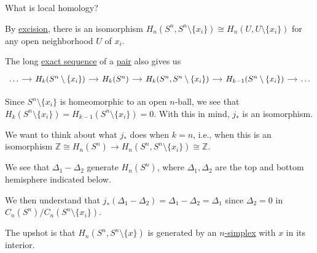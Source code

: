 \begin{problem}
What is local homology?
\end{problem}
\begin{answer}
	By \hyperref[thm:excision]{excision}, there is an isomorphism \(H_n(S^n, S^n \setminus \{x_i\}) \cong H_n(U, U \setminus \{x_i\})\) for any open
	neighborhood \(U\) of \(x_i\).

	The long \hyperref[def:exact-sequence]{exact sequence} of a \hyperref[def:good-pair]{pair} also gives us
	\[
		\begin{tikzcd}[column sep=small]
			\dots & {H_k(S^n\setminus\{x_i\})} & {H_k(S^n)} & {H_k(S^n, S^n\setminus\{x_i\})} & {H_{k-1}(S^n\setminus\{x_i\})} & \dots
			\arrow[from=1-1, to=1-2]
			\arrow[from=1-2, to=1-3]
			\arrow[from=1-3, to=1-4]
			\arrow[from=1-4, to=1-5]
			\arrow[from=1-5, to=1-6]
		\end{tikzcd}
	\]

	Since \(S^n \setminus \{x_i\}\) is homeomorphic to an open \(n\)-ball, we see that \(H_k(S^n \setminus \{x_i\}) = H_{k - 1}(S^n \setminus \{x_i\}) = 0\).
	With this in mind, \(j_\ast\) is an isomorphism.

	We want to think about what \(j_\ast\) does when \(k = n\), i.e., when this is an isomorphism \(\mathbb{Z}\cong H_n(S^n) \to H_n(S^n, S^n \setminus \{x_i\}) \cong \mathbb{Z}\).

	We see that \(\Delta_1 - \Delta_2\) generate \(H_n(S^n)\), where \(\Delta_1, \Delta_2\) are the top and bottom hemisphere indicated below.
	\begin{figure}[H]
		\centering
		\label{fig:les-on-relative-spheres}
	\end{figure}
	We then understand that \(j_\ast(\Delta_1 - \Delta_2) = \Delta_1 - \Delta_2 = \Delta_1\) since \(\Delta_2 = 0\) in \(C_n(S^n)/C_n(S^n \setminus \{x_i\})\).

	The upshot is that \(H_n(S^n, S^n \setminus \{x\})\) is generated by an \hyperref[def:standard-simplex]{\(n\)-simplex} with \(x\) in its interior.


\end{answer}
